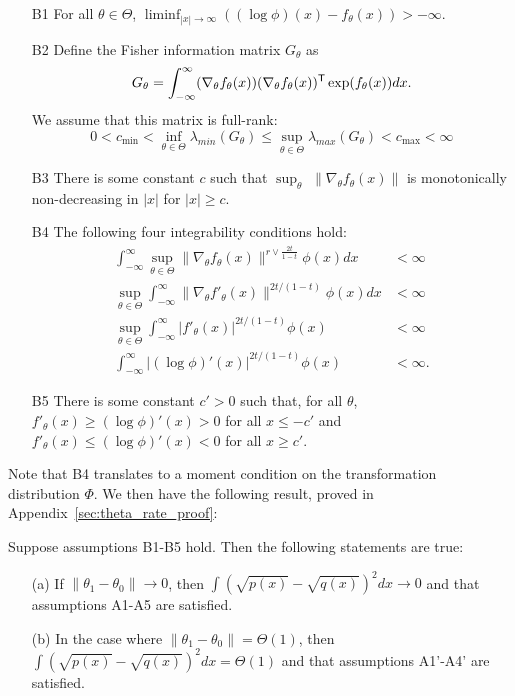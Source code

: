 \documentclass{article}
\begin{document}
{
\begin{enumerate}
\item[B1] For all $\theta \in \Theta$, $\liminf_{|x| \rightarrow \infty} \left( (\log \phi)(x) - f_\theta(x) \right) > -\infty$. 
\item[B2] Define the Fisher information matrix $G_\theta$ as
$$G_{\theta} = \int_{-\infty}^{\infty} (\nabla_{\theta} f_{\theta}(x)) 
                                    (\nabla_{\theta} f_{\theta}(x))^{\mathsf{T}} 
                      \exp( f_{\theta}(x)) dx.$$
 We assume that this matrix is full-rank:
   \[
 0<   c_{\min} <  \inf_{\theta \in \Theta} \lambda_{min}(G_\theta) \leq \sup_{\theta \in \Theta} \lambda_{max}(G_{\theta}) < c_{\max} < \infty
  \]
\item[B3] There is some constant $c$ such that $\sup_\theta$ $\| \nabla_{\theta} f_{\theta} (x) \|$ is monotonically non-decreasing in $|x|$ for $|x| \geq c$.
\item[B4] The following four integrability conditions hold:
  \begin{align*}
  \int_{-\infty}^\infty \sup_{\theta \in \Theta} \| \nabla_{\theta} f_\theta(x) \|^{r \vee \frac{2t}{1-t}} \phi(x) dx &< \infty\\
   \sup_{\theta \in \Theta} \int_{-\infty}^\infty \| \nabla_{\theta} f'_\theta(x) \|^{2t/(1-t)} \phi(x) dx &< \infty\\
  \sup_{\theta \in \Theta} \int_{-\infty}^\infty | f'_{\theta}(x) |^{2t/(1-t)} \phi(x) &< \infty   \\
        \int_{-\infty}^\infty | (\log \phi)'(x) |^{2t/(1-t)} \phi(x) &< \infty.  
  \end{align*}
\item[B5] There is some constant $c' > 0$ such that, for all $\theta$, $f'_\theta(x) \geq (\log \phi)'(x) > 0$ for all $x \leq -c'$ and 
          $f'_\theta(x) \leq (\log \phi)'(x) < 0$ for all $x \geq c'$.
\end{enumerate}
}
Note that B4 translates to a moment condition on the transformation distribution $\Phi$. We then have the following result, proved in Appendix~\ref{sec:theta_rate_proof}:
\begin{proposition}
\label{prop:theta_rate}
Suppose assumptions B1-B5 hold. Then the following statements are true:
\begin{enumerate}
\item[(a)] If $\| \theta_1 - \theta_0 \| \rightarrow 0$, then $\int (\sqrt{p(x)} - \sqrt{q(x)})^2 dx \rightarrow 0$ and that assumptions A1-A5 are satisfied. 
\item[(b)] In the case where $\| \theta_1 - \theta_0\| = \Theta(1)$, then $\int (\sqrt{p(x)} - \sqrt{q(x)})^2 dx = \Theta(1)$ and that assumptions A1'-A4' are satisfied.
\end{enumerate}
\end{proposition}
\end{document}
